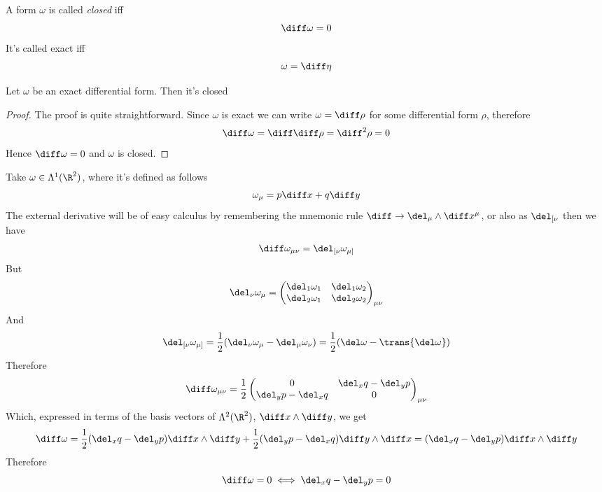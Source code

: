 \documentclass[../mmf.tex]{subfiles}
\begin{document}
\begin{dfn}
	A form $\omega$ is called \textit{closed} iff
	\begin{equation}
		\diff\omega=0
		\label{eq:closedform}
	\end{equation}
	It's called exact iff
	\begin{equation}
		\omega=\diff\eta
		\label{eq:exactform}
	\end{equation}
\end{dfn}
\begin{thm}
	Let $\omega$ be an exact differential form. Then it's closed
\end{thm}
\begin{proof}
	The proof is quite straightforward. Since $\omega$ is exact we can write $\omega=\diff\rho$ for some differential form $\rho$, therefore
	\begin{equation*}
		\diff\omega=\diff\diff\rho=\diff^2\rho=0
	\end{equation*}
	Hence $\diff\omega=0$ and $\omega$ is closed.
\end{proof}
\begin{eg}
	Take $\omega\in\Lambda^1(\R^2)$, where it's defined as follows
	\begin{equation}
		\omega_\mu=p\diff x+q\diff y
		\label{eq:omega}
	\end{equation}
	The external derivative will be of easy calculus by remembering the mnemonic rule $\diff\to\del_\mu\wedge\diff x^\mu$, or also as $\del_{[\nu}$ then we have
	\begin{equation*}
		\diff\omega_{\mu\nu}=\del_{[\nu}\omega_{\mu]}
	\end{equation*}
	But
	\begin{equation*}
		\del_\nu\omega_\mu=\begin{pmatrix}
			\del_1\omega_1&\del_1\omega_2\\
			\del_2\omega_1&\del_2\omega_2
		\end{pmatrix}_{\mu\nu}
	\end{equation*}
	And
	\begin{equation*}
		\del_{[\nu}\omega_{\mu]}=\frac{1}{2}(\del_\nu\omega_\mu-\del_\mu\omega_\nu)=\frac{1}{2}(\del\omega-\trans{\del\omega})
	\end{equation*}
	Therefore
	\begin{equation*}
		\diff\omega_{\mu\nu}=\frac{1}{2}\begin{pmatrix}
			0&\del_xq-\del_yp\\
			\del_yp-\del_xq&0
		\end{pmatrix}_{\mu\nu}
	\end{equation*}
	Which, expressed in terms of the basis vectors of $\Lambda^2(\R^2)$, $\diff x\wedge\diff y$, we get
	\begin{equation}
		\diff\omega=\frac{1}{2}(\del_xq-\del_yp)\diff x\wedge\diff y+\frac{1}{2}(\del_yp-\del_xq)\diff y\wedge\diff x=(\del_xq-\del_yp)\diff x\wedge\diff y
		\label{eq:finalexamplecdfm}
	\end{equation}
	Therefore
	\begin{equation}
		\diff\omega=0\iff\del_xq-\del_yp=0
		\label{eq:exactformeex}
	\end{equation}
\end{eg}
\end{document}
